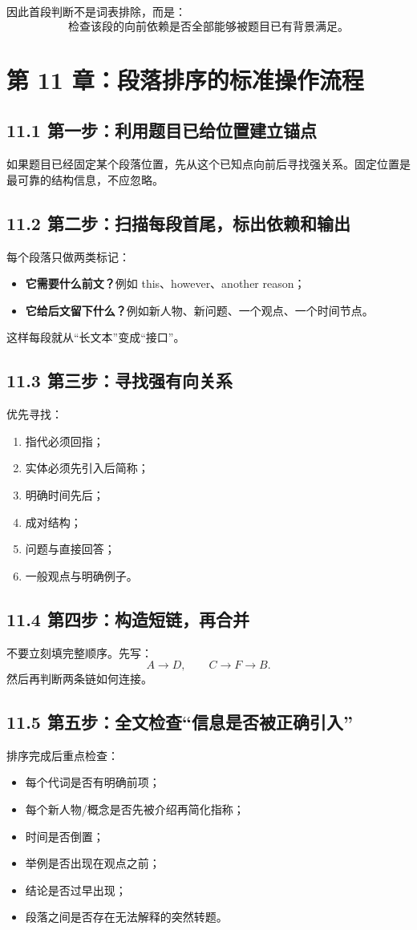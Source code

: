 \documentclass[11pt,a4paper]{ctexart}
\newcommand{\kw}[1]{\textbf{#1}}
\begin{document}
因此首段判断不是词表排除，而是：
\[
\boxed{\text{检查该段的向前依赖是否全部能够被题目已有背景满足。}}
\]

\section{第 11 章：段落排序的标准操作流程}

\subsection{11.1 第一步：利用题目已给位置建立锚点}
如果题目已经固定某个段落位置，先从这个已知点向前后寻找强关系。固定位置是最可靠的结构信息，不应忽略。

\subsection{11.2 第二步：扫描每段首尾，标出依赖和输出}
每个段落只做两类标记：
\begin{itemize}
  \item \kw{它需要什么前文？}例如 this、however、another reason；
  \item \kw{它给后文留下什么？}例如新人物、新问题、一个观点、一个时间节点。
\end{itemize}
这样每段就从“长文本”变成“接口”。

\subsection{11.3 第三步：寻找强有向关系}
优先寻找：
\begin{enumerate}
  \item 指代必须回指；
  \item 实体必须先引入后简称；
  \item 明确时间先后；
  \item 成对结构；
  \item 问题与直接回答；
  \item 一般观点与明确例子。
\end{enumerate}

\subsection{11.4 第四步：构造短链，再合并}
不要立刻填完整顺序。先写：
\[
A\rightarrow D,
\qquad
C\rightarrow F\rightarrow B.
\]
然后再判断两条链如何连接。

\subsection{11.5 第五步：全文检查“信息是否被正确引入”}
排序完成后重点检查：
\begin{itemize}
  \item 每个代词是否有明确前项；
  \item 每个新人物/概念是否先被介绍再简化指称；
  \item 时间是否倒置；
  \item 举例是否出现在观点之前；
  \item 结论是否过早出现；
  \item 段落之间是否存在无法解释的突然转题。
\end{itemize}
\end{document}
